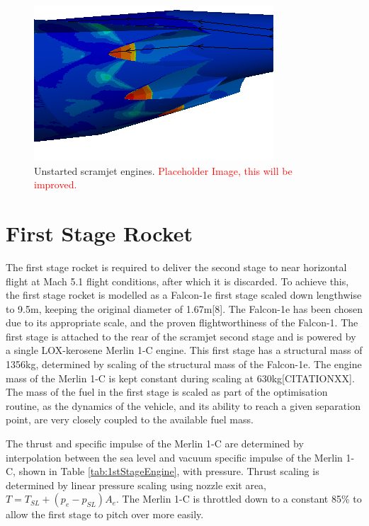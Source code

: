 \begin{figure}
	\centering
	\includegraphics[width=0.7\linewidth]{figures/3_vehicle_design/Unstart}
	\caption{Unstarted scramjet engines. \textcolor{red}{Placeholder Image, this will be improved.}}
	\label{fig:Unstart}
\end{figure}


\section{First Stage Rocket}
The first stage rocket is required to deliver the second stage to near horizontal flight at Mach 5.1 flight conditions,
after which it is discarded. To achieve this, the first stage rocket is modelled as a Falcon-1e first stage scaled down
lengthwise to 9.5m, keeping the original diameter of 1.67m[8]. 
The Falcon-1e has been chosen due to its appropriate scale, and the proven flightworthiness of the Falcon-1. 
 The first stage is attached to the rear of the scramjet
second stage and is powered by a single LOX-kerosene Merlin 1-C engine. This first stage has a structural mass of
1356kg, determined by scaling of the structural mass of the Falcon-1e. The engine mass of the Merlin 1-C is kept constant during scaling at 630kg[CITATIONXX]. The mass of the
fuel in the first stage is scaled as part of the optimisation routine, as the dynamics of the vehicle, and its ability to reach a
given separation point, are very closely coupled to the available fuel mass.

The thrust and specific impulse of the Merlin 1-C are determined by interpolation between the sea level and vacuum specific impulse of the Merlin 1-C, shown in Table \ref{tab:1stStageEngine}, with pressure. Thrust scaling is determined by linear pressure scaling using nozzle exit area, $T = T_{SL} + (p_e - p_{SL})A_e$. 
 The Merlin 1-C is throttled down to a constant 85\% to allow the first stage to pitch over more easily.

